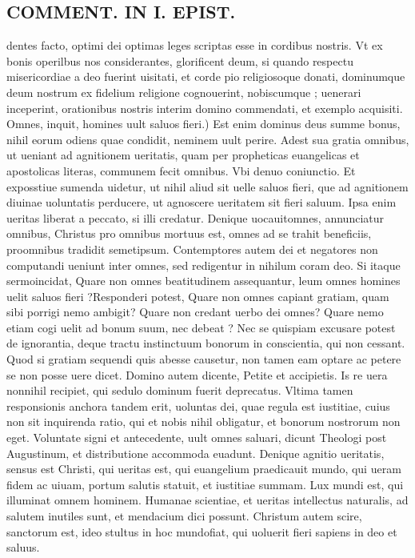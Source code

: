\documentclass{article}
\begin{document}
\begin{pages}
\section*{COMMENT. IN I. EPIST. }
\marginpar{[ p.482 ]}\pstart dentes facto, optimi dei optimas leges scriptas esse in cordibus nostris. Vt ex bonis operilbus nos considerantes, glorificent deum, si quando respectu misericordiae a deo fuerint uisitati, et corde pio religiosoque donati, dominumque deum nostrum ex fidelium religione cognouerint, nobiscumque ; uenerari inceperint, orationibus nostris interim domino commendati, et exemplo acquisiti. Omnes, inquit, homines uult saluos fieri.) Est enim dominus deus summe bonus, nihil eorum odiens quae condidit, neminem uult perire. Adest sua gratia omnibus, ut ueniant ad agnitionem ueritatis, quam per propheticas euangelicas et apostolicas literas, communem fecit omnibus. Vbi denuo coniunctio. Et exposstiue sumenda uidetur, ut nihil aliud sit uelle saluos fieri, que ad agnitionem diuinae uoluntatis perducere, ut agnoscere ueritatem sit fieri saluum. Ipsa enim ueritas liberat a peccato, si illi credatur. Denique uocauitomnes, annunciatur omnibus, Christus pro omnibus mortuus est, omnes ad se trahit beneficiis, proomnibus tradidit semetipsum. Contemptores autem dei et negatores non computandi ueniunt inter omnes, sed redigentur in nihilum coram deo. Si itaque sermoincidat, Quare non omnes beatitudinem assequantur, leum omnes homines uelit saluos fieri ?Responderi potest, Quare non omnes capiant gratiam, quam sibi porrigi nemo ambigit? Quare non credant uerbo dei omnes? Quare nemo etiam cogi uelit ad bonum suum, nec debeat ? Nec se quispiam excusare potest de ignorantia, deque tractu instinctuum bonorum in conscientia, qui non cessant. Quod si gratiam sequendi quis abesse causetur, non tamen eam optare ac petere se non posse uere dicet. Domino autem dicente, Petite et accipietis. Is re uera nonnihil recipiet, qui sedulo dominum fuerit deprecatus. Vltima tamen responsionis anchora tandem erit, uoluntas dei, quae regula est iustitiae, cuius non sit inquirenda ratio, qui et nobis nihil obligatur, et bonorum nostrorum non eget. Voluntate signi et antecedente, uult omnes saluari, dicunt Theologi post Augustinum, et distributione accommoda euadunt. Denique agnitio ueritatis, sensus est Christi, qui ueritas est, qui euangelium praedicauit mundo, qui ueram fidem ac uiuam, portum salutis statuit, et iustitiae summam. Lux mundi est, qui illuminat omnem hominem. Humanae scientiae, et ueritas intellectus naturalis, ad salutem inutiles sunt, et mendacium dici possunt. Christum autem scire, sanctorum est, ideo stultus in hoc mundofiat, qui uoluerit fieri sapiens in deo et saluus.  \pend
{}
{}

\end{pages}
\end{document}
